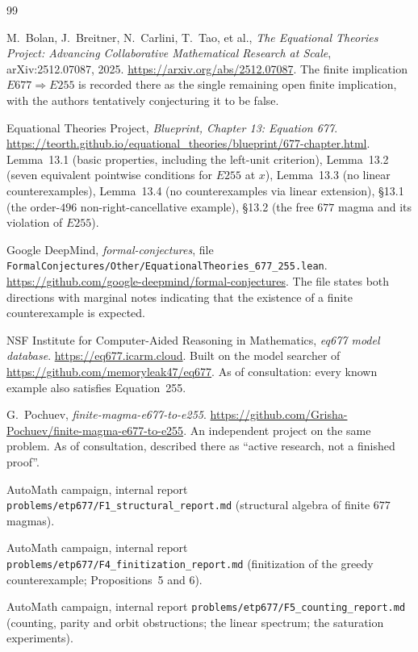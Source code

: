 \documentclass[11pt]{article}
\theoremstyle{plain}
\theoremstyle{definition}
\theoremstyle{remark}
\numberwithin{equation}{section}
\begin{document}
\begin{thebibliography}{99}

M.~Bolan, J.~Breitner, N.~Carlini, T.~Tao, et al.,
\emph{The Equational Theories Project: Advancing Collaborative Mathematical Research at
Scale}, arXiv:2512.07087, 2025.
\url{https://arxiv.org/abs/2512.07087}.
The finite implication $E677\Rightarrow E255$ is recorded there as the single remaining open
finite implication, with the authors tentatively conjecturing it to be false.

Equational Theories Project, \emph{Blueprint, Chapter 13: Equation 677}.
\url{https://teorth.github.io/equational_theories/blueprint/677-chapter.html}.
Lemma~13.1 (basic properties, including the left-unit criterion), Lemma~13.2 (seven
equivalent pointwise conditions for $E255$ at $x$), Lemma~13.3 (no linear counterexamples),
Lemma~13.4 (no counterexamples via linear extension), \S13.1 (the order-$496$
non-right-cancellative example), \S13.2 (the free $677$ magma and its violation of $E255$).

Google DeepMind, \emph{formal-conjectures}, file
\texttt{FormalConjectures/Other/EquationalTheories\_677\_255.lean}.
\url{https://github.com/google-deepmind/formal-conjectures}.
The file states both directions with marginal notes indicating that the existence of a finite
counterexample is expected.

NSF Institute for Computer-Aided Reasoning in Mathematics, \emph{eq677 model database}.
\url{https://eq677.icarm.cloud}. Built on the model searcher of
\url{https://github.com/memoryleak47/eq677}. As of consultation: every known example also
satisfies Equation~255.

G.~Pochuev, \emph{finite-magma-e677-to-e255}.
\url{https://github.com/Grisha-Pochuev/finite-magma-e677-to-e255}.
An independent project on the same problem. As of consultation, described there as ``active
research, not a finished proof''.

AutoMath campaign, internal report \texttt{problems\slash etp677\slash F1\_structural\_report.md}
(structural algebra of finite $677$ magmas).

AutoMath campaign, internal report \texttt{problems\slash etp677\slash F4\_finitization\_report.md}
(finitization of the greedy counterexample; Propositions~5 and 6).

AutoMath campaign, internal report \texttt{problems\slash etp677\slash F5\_counting\_report.md}
(counting, parity and orbit obstructions; the linear spectrum; the saturation experiments).


\end{thebibliography}
\end{document}

